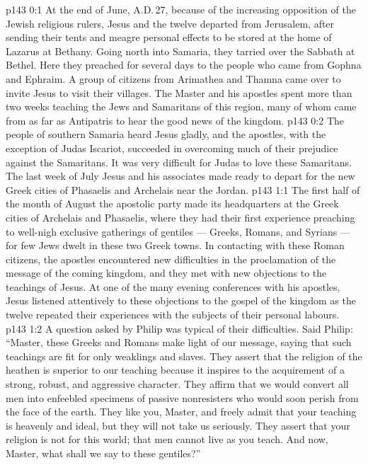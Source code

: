 \author{Midwayer Commission}
\vs p143 0:1 At the end of June, A.D.\,27, because of the increasing opposition of the Jewish religious rulers, Jesus and the twelve departed from Jerusalem, after sending their tents and meagre personal effects to be stored at the home of Lazarus at Bethany. Going north into Samaria, they tarried over the Sabbath at Bethel. Here they preached for several days to the people who came from Gophna and Ephraim. A group of citizens from Arimathea and Thamna came over to invite Jesus to visit their villages. The Master and his apostles spent more than two weeks teaching the Jews and Samaritans of this region, many of whom came from as far as Antipatris to hear the good news of the kingdom.
\vs p143 0:2 The people of southern Samaria heard Jesus gladly, and the apostles, with the exception of Judas Iscariot, succeeded in overcoming much of their prejudice against the Samaritans. It was very difficult for Judas to love these Samaritans. The last week of July Jesus and his associates made ready to depart for the new Greek cities of Phasaelis and Archelais near the Jordan.
\vs p143 1:1 The first half of the month of August the apostolic party made its headquarters at the Greek cities of Archelais and Phasaelis, where they had their first experience preaching to well\hyp{}nigh exclusive gatherings of gentiles --- Greeks, Romans, and Syrians --- for few Jews dwelt in these two Greek towns. In contacting with these Roman citizens, the apostles encountered new difficulties in the proclamation of the message of the coming kingdom, and they met with new objections to the teachings of Jesus. At one of the many evening conferences with his apostles, Jesus listened attentively to these objections to the gospel of the kingdom as the twelve repeated their experiences with the subjects of their personal labours.
\vs p143 1:2 A question asked by Philip was typical of their difficulties. Said Philip: “Master, these Greeks and Romans make light of our message, saying that such teachings are fit for only weaklings and slaves. They assert that the religion of the heathen is superior to our teaching because it inspires to the acquirement of a strong, robust, and aggressive character. They affirm that we would convert all men into enfeebled specimens of passive nonresisters who would soon perish from the face of the earth. They like you, Master, and freely admit that your teaching is heavenly and ideal, but they will not take us seriously. They assert that your religion is not for this world; that men cannot live as you teach. And now, Master, what shall we say to these gentiles?”
